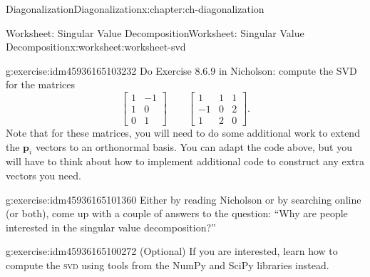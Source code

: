 \documentclass[oneside,10pt,]{book}
\newcommand{\initialism}[1]{\textsc{\MakeLowercase{#1}}}
\numberwithin{equation}{section}
\newcommand{\bbm}{\begin{bmatrix}}
\newcommand{\ebm}{\end{bmatrix}}
\newcommand{\vecp}{\mathbf{p}}
\newcommand{\amp}{&}
\begin{document}
\begin{chapterptx}{Diagonalization}{}{Diagonalization}{}{}{x:chapter:ch-diagonalization}
\begin{worksheet-section}{Worksheet: Singular Value Decomposition}{}{Worksheet: Singular Value Decomposition}{}{}{x:worksheet:worksheet-svd}
\begin{divisionexercise}{1}{}{}{g:exercise:idm45936165103232}
Do Exercise 8.6.9 in Nicholson: compute the SVD for the matrices%
\begin{equation*}
\bbm 1\amp -1\\1\amp 0\\0\amp 1\ebm \quad \quad \bbm 1\amp 1\amp 1\\-1\amp 0\amp 2 \\1\amp 2\amp 0\ebm\text{.}
\end{equation*}
Note that for these matrices, you will need to do some additional work to extend the \(\vecp_i\) vectors to an orthonormal basis. You can adapt the code above, but you will have to think about how to implement additional code to construct any extra vectors you need.%
\end{divisionexercise}%
\begin{divisionexercise}{2}{}{}{g:exercise:idm45936165101360}%
Either by reading Nicholson or by searching online (or both), come up with a couple of answers to the question: ``Why are people interested in the singular value decomposition?''%
\end{divisionexercise}%
\begin{divisionexercise}{3}{}{}{g:exercise:idm45936165100272}%
(Optional) If you are interested, learn how to compute the \initialism{SVD} using tools from the NumPy and SciPy libraries instead.%
\end{divisionexercise}%
\end{worksheet-section}
\restoregeometry
\end{chapterptx}
%
%
\typeout{************************************************}
\typeout{************************************************}
%
\end{document}
